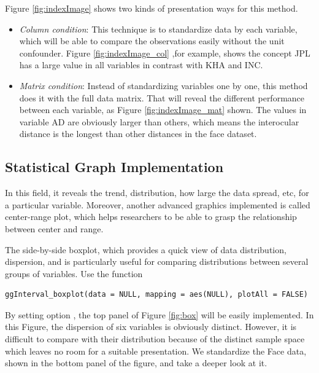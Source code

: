 \documentclass[article]{jss}
\begin{document}
Figure \ref{fig:indexImage} shows two kinds of presentation ways for this method.

\begin{itemize}
  \item \emph{Column condition}: This technique is to standardize data by each variable, which will be able to compare the observations easily without the unit confounder. Figure \ref{fig:indexImage_col} ,for example, shows the concept JPL has a large value in all variables in contrast with KHA and INC.
  \item \emph{Matrix condition}: Instead of standardizing variables one by one, this method does it with the full data matrix. That will reveal the different performance between each variable, as Figure \ref{fig:indexImage_mat} shown. The values in variable AD are obviously larger than others, which means the interocular distance is the longest than other distances in the face dataset.
\end{itemize}


\subsection{Statistical Graph Implementation}

In this field, it reveals the trend, distribution, how large the data spread, etc, for a particular variable. Moreover, another advanced graphics implemented is called center-range plot, which helps researchers to be able to grasp the relationship between center and range. 

The side-by-side boxplot, which provides a quick view of data distribution, dispersion, and is particularly useful for comparing distributions between several groups of variables. Use the function

\begin{verbatim}
ggInterval_boxplot(data = NULL, mapping = aes(NULL), plotAll = FALSE)
\end{verbatim}

By setting option , the top panel of Figure \ref{fig:box} will be easily implemented. In this Figure, the dispersion of six variables is obviously distinct. However, it is difficult to compare with their distribution because of the distinct sample space which leaves no room for a suitable presentation. We standardize the Face data, shown in the bottom panel of the figure, and take a deeper look at it.
\end{document}
